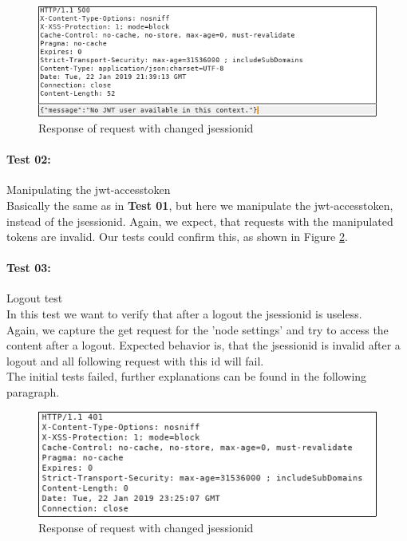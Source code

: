 \documentclass{scrreprt}
\begin{document}
\begin{figure}[h!]
	\centering
	\includegraphics[width=14cm]{report/session02.png}
	\caption{Response of request with changed jsessionid}
	\label{session02}
\end{figure}

\paragraph{Test 02:} Manipulating the jwt-accesstoken \\
Basically the same as in \textbf{Test 01}, but here we manipulate the jwt-accesstoken, instead of the jsessionid.
Again, we expect, that requests with the manipulated tokens are invalid. Our tests could confirm this, as shown in Figure \ref{session03}.

\paragraph{Test 03:} Logout test \\
In this test we want to verify that after a logout the jsessionid is useless. \\
Again, we capture the get request for the 'node settings' and try to access the content after a logout. Expected behavior is, that the jsessionid is invalid after a logout and all following request with this id will fail. \\
The initial tests failed, further explanations can be found in the following paragraph.
\begin{figure}[h!]
	\centering
	\includegraphics[width=14cm]{report/session03.png}
	\caption{Response of request with changed jsessionid}
	\label{session03}
\end{figure}
\end{document}
